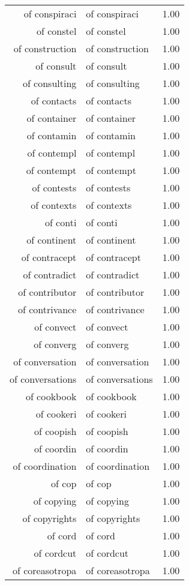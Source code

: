 \begin{table}[ht]
\begin{tabular}{rlr}
  of conspiraci & of conspiraci & 1.00 \\ 
  of constel & of constel & 1.00 \\ 
  of construction & of construction & 1.00 \\ 
  of consult & of consult & 1.00 \\ 
  of consulting & of consulting & 1.00 \\ 
  of contacts & of contacts & 1.00 \\ 
  of container & of container & 1.00 \\ 
  of contamin & of contamin & 1.00 \\ 
  of contempl & of contempl & 1.00 \\ 
  of contempt & of contempt & 1.00 \\ 
  of contests & of contests & 1.00 \\ 
  of contexts & of contexts & 1.00 \\ 
  of conti & of conti & 1.00 \\ 
  of continent & of continent & 1.00 \\ 
  of contracept & of contracept & 1.00 \\ 
  of contradict & of contradict & 1.00 \\ 
  of contributor & of contributor & 1.00 \\ 
  of contrivance & of contrivance & 1.00 \\ 
  of convect & of convect & 1.00 \\ 
  of converg & of converg & 1.00 \\ 
  of conversation & of conversation & 1.00 \\ 
  of conversations & of conversations & 1.00 \\ 
  of cookbook & of cookbook & 1.00 \\ 
  of cookeri & of cookeri & 1.00 \\ 
  of coopish & of coopish & 1.00 \\ 
  of coordin & of coordin & 1.00 \\ 
  of coordination & of coordination & 1.00 \\ 
  of cop & of cop & 1.00 \\ 
  of copying & of copying & 1.00 \\ 
  of copyrights & of copyrights & 1.00 \\ 
  of cord & of cord & 1.00 \\ 
  of cordcut & of cordcut & 1.00 \\ 
  of coreasotropa & of coreasotropa & 1.00 \\ 

\end{tabular}
\end{table}
